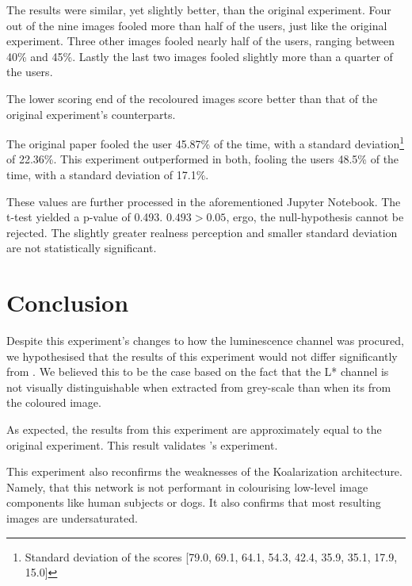 \documentclass{article}
\begin{document}
        The results were similar, yet slightly better, than the original experiment. Four out of the nine images fooled more than half of the users, just like the original experiment. Three other images fooled nearly half of the users, ranging between 40\% and 45\%. Lastly the last two images fooled slightly more than a quarter of the users. 
        
        The lower scoring end of the recoloured images score better than that of the original experiment's counterparts. 
        
        The original paper fooled the user 45.87\% of the time, with a standard deviation\footnote{Standard deviation of the scores [79.0, 69.1, 64.1, 54.3, 42.4, 35.9, 35.1, 17.9, 15.0]} of 22.36\%. This experiment outperformed in both, fooling the users 48.5\% of the time, with a standard deviation of 17.1\%.
        
        These values are further processed in the aforementioned Jupyter Notebook. The t-test yielded a p-value of 0.493. $0.493 > 0.05$, ergo, the null-hypothesis cannot be rejected. The slightly greater realness perception and smaller standard deviation are not statistically significant. 
        
        
            

\section{Conclusion}
    Despite this experiment's changes to how the luminescence channel was procured, we hypothesised that the results of this experiment would not differ significantly from \cite{deepkoal2017}. We believed this to be the case based on the fact that the L* channel is not visually distinguishable when extracted from grey-scale than when its from the coloured image.
    
    As expected, the results from this experiment are approximately equal to the original experiment. 
    This result validates \cite{deepkoal2017}'s experiment.
    
    This experiment also reconfirms the weaknesses of the Koalarization architecture. Namely, that this network is not performant in colourising low-level image components like human subjects or dogs. It also confirms that most resulting images are undersaturated.
    
\end{document}

